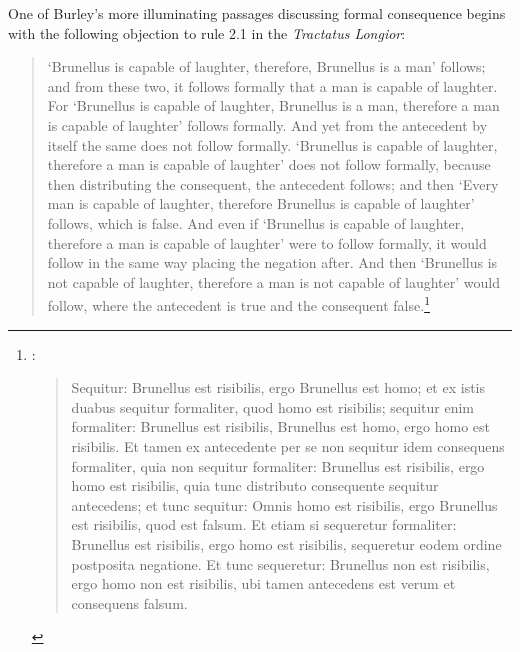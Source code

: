 \documentclass[]{birkjour}
\begin{document}
One of Burley's more illuminating passages discussing formal consequence begins with the following objection to rule 2.1 in the \textit{Tractatus Longior}: 
\begin{quote}
	`Brunellus is capable of laughter, therefore, Brunellus is a man' follows; and from these two, it follows formally that a man is capable of laughter. For `Brunellus is capable of laughter, Brunellus is a man, therefore a man is capable of laughter' follows formally. And yet from the antecedent by itself the same does not follow formally. `Brunellus is capable of laughter, therefore a man is capable of laughter' does not follow formally, because then distributing the consequent, the antecedent follows; and then `Every man is capable of laughter, therefore Brunellus is capable of laughter' follows, which is false. And even if `Brunellus is capable of laughter, therefore a man is capable of laughter' were to follow formally, it would follow in the same way placing the negation after. And then `Brunellus is not capable of laughter, therefore a man is not capable of laughter' would follow, where the antecedent is true and the consequent false.\footnote{ \autocite[p. 80.13-29]{BurleyDPAL}:
		\begin{quote}
			Sequitur: Brunellus est risibilis, ergo Brunellus est homo; et ex istis duabus sequitur formaliter, quod homo est risibilis; sequitur enim formaliter: Brunellus est risibilis, Brunellus est homo, ergo homo est risibilis. Et tamen ex antecedente per se non sequitur idem consequens formaliter, quia non sequitur formaliter: Brunellus est risibilis, ergo homo est risibilis, quia tunc distributo consequente sequitur antecedens; et tunc sequitur: Omnis homo est risibilis, ergo Brunellus est risibilis, quod est falsum. Et etiam si sequeretur formaliter: Brunellus est risibilis, ergo homo est risibilis, sequeretur eodem ordine postposita negatione. Et tunc sequeretur: Brunellus non est risibilis, ergo homo non est risibilis, ubi tamen antecedens est verum et consequens falsum.
		\end{quote}}
\end{quote}
\end{document}
